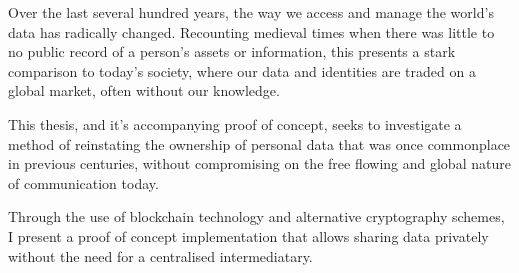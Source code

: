 \abstract

\thispagestyle{plain}
\setcounter{page}{1}

Over the last several hundred years, the way we access and manage the world's data has radically changed. Recounting medieval times when there was little to no public record of a person's assets or information, this presents a stark comparison to today's society, where our data and identities are traded on a global market, often without our knowledge.

This thesis, and it's accompanying proof of concept, seeks to investigate a method of reinstating the ownership of personal data that was once commonplace in previous centuries, without compromising on the free flowing and global nature of communication today.

Through the use of blockchain technology and alternative cryptography schemes, I present a proof of concept implementation that allows sharing data privately without the need for a centralised intermediatary.
